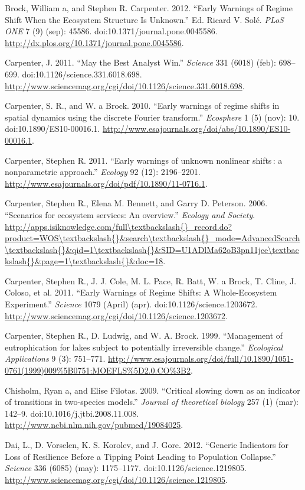 \documentclass[author-year, review]{elsarticle} %
\begin{document}
Brock, William a, and Stephen R. Carpenter. 2012. ``Early Warnings of
Regime Shift When the Ecosystem Structure Is Unknown.'' Ed. Ricard V.
Solé. \emph{PLoS ONE} 7 (9) (sep): 45586.
doi:10.1371/journal.pone.0045586.
\url{http://dx.plos.org/10.1371/journal.pone.0045586}.

Carpenter, J. 2011. ``May the Best Analyst Win.'' \emph{Science} 331
(6018) (feb): 698--699. doi:10.1126/science.331.6018.698.
\url{http://www.sciencemag.org/cgi/doi/10.1126/science.331.6018.698}.

Carpenter, S. R., and W. a Brock. 2010. ``Early warnings of regime
shifts in spatial dynamics using the discrete Fourier transform.''
\emph{Ecosphere} 1 (5) (nov): 10. doi:10.1890/ES10-00016.1.
\url{http://www.esajournals.org/doi/abs/10.1890/ES10-00016.1}.

Carpenter, Stephen R. 2011. ``Early warnings of unknown nonlinear
shifts : a nonparametric approach.'' \emph{Ecology} 92 (12): 2196--2201.
\url{http://www.esajournals.org/doi/pdf/10.1890/11-0716.1}.

Carpenter, Stephen R., Elena M. Bennett, and Garry D. Peterson. 2006.
``Scenarios for ecosystem services: An overview.'' \emph{Ecology and
Society}.
\url{http://apps.isiknowledge.com/full\textbackslash{}_record.do?product=WOS\textbackslash{}\&search\textbackslash{}_mode=AdvancedSearch\textbackslash{}\&qid=1\textbackslash{}\&SID=U1ADlMa62oB3pn11jce\textbackslash{}\&page=1\textbackslash{}\&doc=18}.

Carpenter, Stephen R., J. J. Cole, M. L. Pace, R. Batt, W. a Brock, T.
Cline, J. Coloso, et al. 2011. ``Early Warnings of Regime Shifts: A
Whole-Ecosystem Experiment.'' \emph{Science} 1079 (April) (apr).
doi:10.1126/science.1203672.
\url{http://www.sciencemag.org/cgi/doi/10.1126/science.1203672}.

Carpenter, Stephen R., D. Ludwig, and W. A. Brock. 1999. ``Management of
eutrophication for lakes subject to potentially irreversible change.''
\emph{Ecological Applications} 9 (3): 751--771.
\url{http://www.esajournals.org/doi/full/10.1890/1051-0761(1999)009\%5B0751:MOEFLS\%5D2.0.CO\%3B2}.

Chisholm, Ryan a, and Elise Filotas. 2009. ``Critical slowing down as an
indicator of transitions in two-species models.'' \emph{Journal of
theoretical biology} 257 (1) (mar): 142--9.
doi:10.1016/j.jtbi.2008.11.008.
\url{http://www.ncbi.nlm.nih.gov/pubmed/19084025}.

Dai, L., D. Vorselen, K. S. Korolev, and J. Gore. 2012. ``Generic
Indicators for Loss of Resilience Before a Tipping Point Leading to
Population Collapse.'' \emph{Science} 336 (6085) (may): 1175--1177.
doi:10.1126/science.1219805.
\url{http://www.sciencemag.org/cgi/doi/10.1126/science.1219805}.
\end{document}
